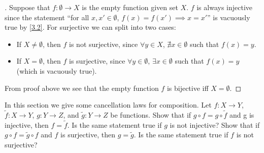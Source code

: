 \begin{proof}[]
  Suppose that \(f : \emptyset \to X\) is the empty function given set \(X\).
  \(f\) is always injective since the statement ``for all \(x, x' \in \emptyset\), \(f(x) = f(x') \implies x = x'\)'' is vacuously true by \cref{3.2}.
  For surjective we can split into two cases:
  \begin{itemize}
    \item If \(X \neq \emptyset\), then \(f\) is not surjective, since \(\forall y \in X\), \(\nexists x \in \emptyset\) such that \(f(x) = y\).
    \item If \(X = \emptyset\), then \(f\) is surjective, since \(\forall y \in \emptyset\), \(\exists x \in \emptyset\) such that \(f(x) = y\) (which is vacuously true).
  \end{itemize}
  From proof above we see that the empty function \(f\) is bijective iff \(X = \emptyset\).
\end{proof}

\begin{ex}\label{ex:3.3.4}
  In this section we give some cancellation laws for composition.
  Let \(f : X \to Y\), \(\tilde{f} : X \to Y\), \(g : Y \to Z\), and \(\tilde{g} : Y \to Z\) be functions.
  Show that if \(g \circ f = g \circ \tilde{f}\) and g is injective, then \(f = \tilde{f}\).
  Is the same statement true if \(g\) is not injective?
  Show that if \(g \circ f = \tilde{g} \circ f\) and \(f\) is surjective, then \(g = \tilde{g}\).
  Is the same statement true if \(f\) is not surjective?
\end{ex}

